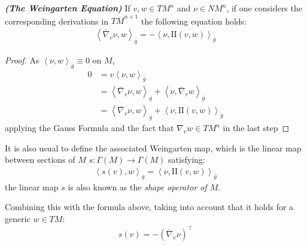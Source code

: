 \begin{proposition}
	\textbf{\em (The Weingarten Equation)} If $v, w \in TM^n$ and $\nu \in NM^n$, if one considers the corresponding derivations in $T\overline{M}^{n+1}$ the following equation holds:
	\begin{align*}
			\left\langle \overline{\nabla}_v \nu, w \right\rangle_{\overline{g}} = - \left\langle \nu, \mathrm{I\!I} (v, w) \right\rangle_{\overline{g}}
	\end{align*}
\end{proposition}
\begin{proof}
	As $\left\langle \nu, w \right\rangle_{\overline{g}}\equiv 0$ on $M$, 
	\begin{align*}
		0&=v\left\langle \nu, w \right\rangle_{\overline{g}}\\
		&=\left\langle  \overline{\nabla}_v \nu, w \right\rangle_{\overline{g}} + \left\langle  \nu, \overline{\nabla}_v w \right\rangle_{\overline{g}}\\
		&=\left\langle \overline{\nabla}_v \nu, w \right\rangle_{\overline{g}} + \left\langle \nu, \mathrm{I\!I} (v, w) \right\rangle_{\overline{g}}
	\end{align*}
	applying the Gauss Formula and the fact that $\nabla_v w \in TM^n$ in the last step
\end{proof}
It is also usual to define the associated Weingarten map, which is the linear map between sections of $M$  $s:\Gamma(M)\rightarrow\Gamma(M)$ satisfying:
\begin{align*}
	\left\langle s(v), w \right\rangle_{g} = \left\langle \nu, \mathrm{I\!I} (v, w) \right\rangle_{\overline{g}}
\end{align*}
the linear map $s$ is also known as the {\em shape operator of $M$}. 

Combining this with the formula above, taking into account that it holds for a generic $w \in TM$:
\begin{align*}
	s(v) = -(\overline{\nabla}_v \nu)^\top
\end{align*}


